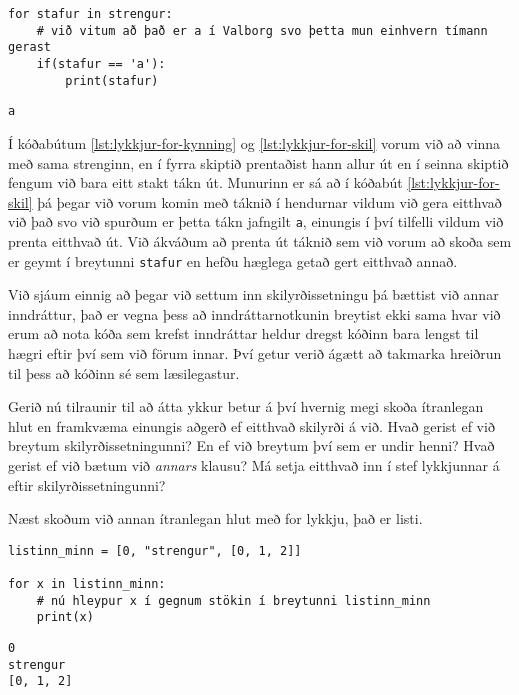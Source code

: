 \lstset{style=venjulegt}
\begin{lstlisting}[caption=For lykkja og skilyrðissetningar, label=lst:lykkjur-for-skil]
for stafur in strengur:
	# við vitum að það er a í Valborg svo þetta mun einhvern tímann gerast
	if(stafur == 'a'):
		print(stafur)
\end{lstlisting}
\lstset{style=uttak}
\begin{lstlisting}
a
\end{lstlisting}

Í kóðabútum \ref{lst:lykkjur-for-kynning} og \ref{lst:lykkjur-for-skil} vorum við að vinna með sama strenginn, en í fyrra skiptið prentaðist hann allur út en í seinna skiptið fengum við bara eitt stakt tákn út.
Munurinn er sá að í kóðabút \ref{lst:lykkjur-for-skil} þá þegar við vorum komin með táknið í hendurnar vildum við gera eitthvað við það svo við spurðum er þetta tákn jafngilt \texttt{a}, einungis í því tilfelli vildum við prenta eitthvað út.
Við ákváðum að prenta út táknið sem við vorum að skoða sem er geymt í breytunni \texttt{stafur} en hefðu hæglega getað gert eitthvað annað.

Við sjáum einnig að þegar við settum inn skilyrðissetningu þá bættist við annar inndráttur, það er vegna þess að inndráttarnotkunin breytist ekki sama hvar við erum að nota kóða sem krefst inndráttar heldur dregst kóðinn bara lengst til hægri eftir því sem við förum innar. 
Því getur verið ágætt að takmarka hreiðrun til þess að kóðinn sé sem læsilegastur.

Gerið nú tilraunir til að átta ykkur betur á því hvernig megi skoða ítranlegan hlut en framkvæma einungis aðgerð ef eitthvað skilyrði á við.
Hvað gerist ef við breytum skilyrðissetningunni?
En ef við breytum því sem er undir henni?
Hvað gerist ef við bætum við \textit{annars} klausu?
Má setja eitthvað inn í stef lykkjunnar á eftir skilyrðissetningunni?

Næst skoðum við annan ítranlegan hlut með for lykkju, það er listi.

\lstset{style=venjulegt}	
	
\begin{lstlisting}[caption=For lykkja með lista, label=lst:lykkjur-for-listi]
listinn_minn = [0, "strengur", [0, 1, 2]]

for x in listinn_minn:
	# nú hleypur x í gegnum stökin í breytunni listinn_minn
	print(x)

\end{lstlisting}
\lstset{style=uttak}
\begin{lstlisting}	
0
strengur
[0, 1, 2]
\end{lstlisting}



